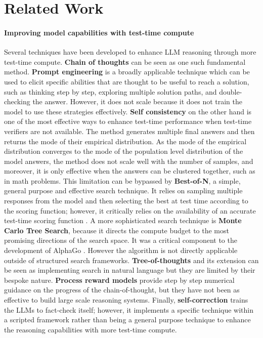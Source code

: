 \section{Related Work}
\label{sec:relatedwork}


\paragraph{Improving model capabilities with test-time compute}

Several techniques have been developed 
to enhance LLM reasoning through more test-time compute.
\textbf{Chain of thoughts} \citep{wei2022chain} 
can be seen as one such fundamental method. 
\textbf{Prompt engineering} is a broadly applicable technique \citep{white2023prompt}
 which can be used to elicit specific abilities 
that are thought to be useful to reach a solution, 
such as thinking step by step, 
exploring multiple solution paths, and double-checking the answer. 
However, it does not scale because it does not train the model to use these strategies effectively.
\textbf{Self consistency} \citep{wang2022self} on the other hand is one of the most
effective ways to enhance test-time performance when test-time verifiers 
are not available. 
The method generates multiple final answers 
and then returns the mode of their empirical distribution.
As the mode of the empirical distribution converges 
to the mode of the population level distribution of the model answers, 
the method does not scale well with the number of samples, 
and moreover, it is only effective when the answers
can be clustered together, such as in math problems.
This limitation can be bypassed by \textbf{Best-of-N}, a simple, general purpose and effective search technique.
It relies on sampling multiple responses from the model and then 
selecting the best at test time according to the scoring function; 
however, it critically relies on the availability of an accurate 
test-time scoring function \citep{gao2023scaling}.
A more sophisticated search technique is \textbf{Monte Carlo Tree Search}, because it directs the compute budget 
to the most promising directions of the search space.
It was a critical component to the development of AlphaGo \cite{silver2017mastering}.
However the algorithm is not directly applicable outside of structured search frameworks.
\textbf{Tree-of-thoughts} \citep{yao2024tree} and its extension \citep{gandhi2024stream, besta2024graph}
can be seen as implementing search in natural language but they are limited by their bespoke nature.
\textbf{Process reward models} 
\cite{lightman2024lets} provide step by step numerical guidance on the progress of the chain-of-thought, but they have not been as effective to build large scale reasoning systems.
Finally, \textbf{self-correction} 
\citep{kumar2024training}
trains the LLMs 
to fact-check itself; 
however, it implements a specific technique within a scripted framework
rather than being a general purpose technique to enhance 
the reasoning capabilities with more test-time compute.

